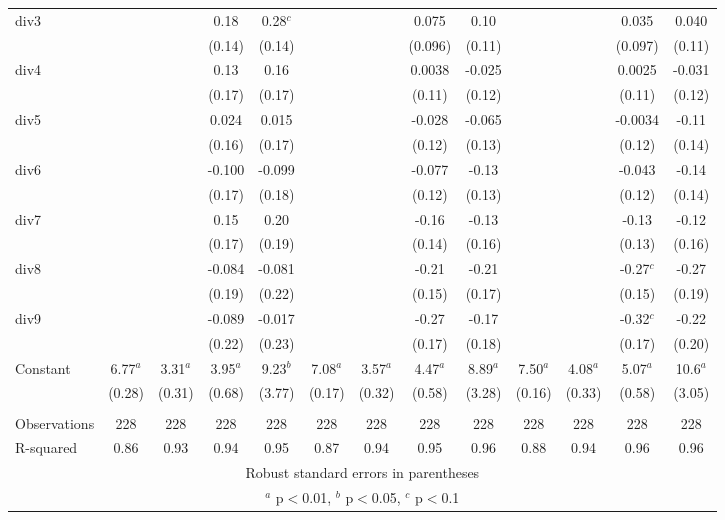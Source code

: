 \documentclass[]{article}
\begin{document}
\begin{tabular}{lcccccccccccc}
div3 &  &  & 0.18 & 0.28$^c$ &  &  & 0.075 & 0.10 &  &  & 0.035 & 0.040 \\
 &  &  & (0.14) & (0.14) &  &  & (0.096) & (0.11) &  &  & (0.097) & (0.11) \\
div4 &  &  & 0.13 & 0.16 &  &  & 0.0038 & -0.025 &  &  & 0.0025 & -0.031 \\
 &  &  & (0.17) & (0.17) &  &  & (0.11) & (0.12) &  &  & (0.11) & (0.12) \\
div5 &  &  & 0.024 & 0.015 &  &  & -0.028 & -0.065 &  &  & -0.0034 & -0.11 \\
 &  &  & (0.16) & (0.17) &  &  & (0.12) & (0.13) &  &  & (0.12) & (0.14) \\
div6 &  &  & -0.100 & -0.099 &  &  & -0.077 & -0.13 &  &  & -0.043 & -0.14 \\
 &  &  & (0.17) & (0.18) &  &  & (0.12) & (0.13) &  &  & (0.12) & (0.14) \\
div7 &  &  & 0.15 & 0.20 &  &  & -0.16 & -0.13 &  &  & -0.13 & -0.12 \\
 &  &  & (0.17) & (0.19) &  &  & (0.14) & (0.16) &  &  & (0.13) & (0.16) \\
div8 &  &  & -0.084 & -0.081 &  &  & -0.21 & -0.21 &  &  & -0.27$^c$ & -0.27 \\
 &  &  & (0.19) & (0.22) &  &  & (0.15) & (0.17) &  &  & (0.15) & (0.19) \\
div9 &  &  & -0.089 & -0.017 &  &  & -0.27 & -0.17 &  &  & -0.32$^c$ & -0.22 \\
 &  &  & (0.22) & (0.23) &  &  & (0.17) & (0.18) &  &  & (0.17) & (0.20) \\
Constant & 6.77$^a$ & 3.31$^a$ & 3.95$^a$ & 9.23$^b$ & 7.08$^a$ & 3.57$^a$ & 4.47$^a$ & 8.89$^a$ & 7.50$^a$ & 4.08$^a$ & 5.07$^a$ & 10.6$^a$ \\
 & (0.28) & (0.31) & (0.68) & (3.77) & (0.17) & (0.32) & (0.58) & (3.28) & (0.16) & (0.33) & (0.58) & (3.05) \\
 &  &  &  &  &  &  &  &  &  &  &  &  \\
Observations & 228 & 228 & 228 & 228 & 228 & 228 & 228 & 228 & 228 & 228 & 228 & 228 \\
 R-squared & 0.86 & 0.93 & 0.94 & 0.95 & 0.87 & 0.94 & 0.95 & 0.96 & 0.88 & 0.94 & 0.96 & 0.96 \\ \hline
\multicolumn{13}{c}{ Robust standard errors in parentheses} \\
\multicolumn{13}{c}{ $^a$ p$<$0.01, $^b$ p$<$0.05, $^c$ p$<$0.1} \\
\end{tabular}
\end{document}
